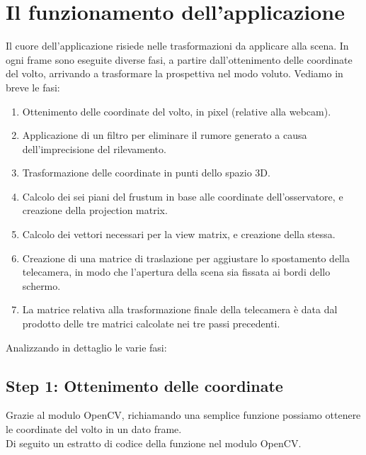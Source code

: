 \section{Il funzionamento dell'applicazione}
Il cuore dell'applicazione risiede nelle trasformazioni da applicare alla scena. In ogni frame sono eseguite diverse fasi, a partire dall'ottenimento delle coordinate del volto, arrivando a trasformare la prospettiva nel modo voluto. Vediamo in breve le fasi:
\begin{enumerate}
\item Ottenimento delle coordinate del volto, in pixel (relative alla webcam).
\item Applicazione di un filtro per eliminare il rumore generato a causa dell'imprecisione del rilevamento.
\item Trasformazione delle coordinate in punti dello spazio 3D.
\item Calcolo dei sei piani del frustum in base alle coordinate dell'osservatore, e creazione della projection matrix.
\item Calcolo dei vettori necessari per la view matrix, e creazione della stessa.
\item Creazione di una matrice di traslazione per aggiustare lo spostamento della telecamera, in modo che l'apertura della scena sia fissata ai bordi dello schermo.
\item La matrice relativa alla trasformazione finale della telecamera è data dal prodotto delle tre matrici calcolate nei tre passi precedenti.
\end{enumerate}
Analizzando in dettaglio le varie fasi:

\subsection*{Step 1: Ottenimento delle coordinate}

Grazie al modulo OpenCV, richiamando una semplice funzione possiamo ottenere le coordinate del volto in un dato frame.\\

Di seguito un estratto di codice della funzione nel modulo OpenCV.

